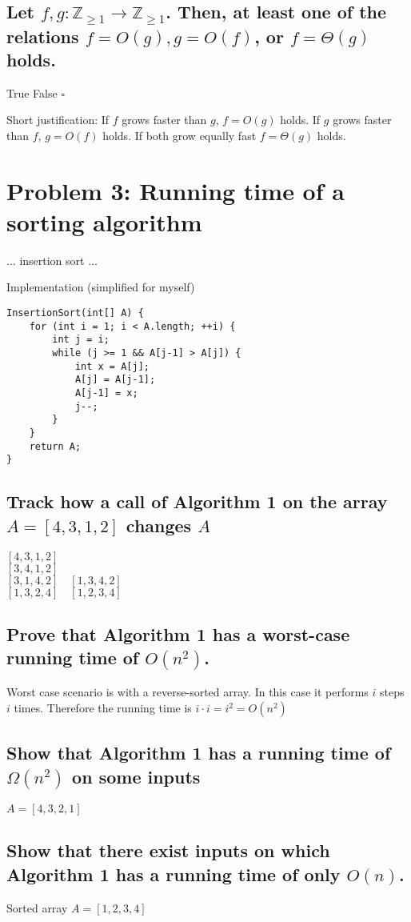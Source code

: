 \documentclass[12pt, a4]{article}
\newcommand{\cmark}{\ding{51}}%
\newcommand{\checkedbox}{\rlap{$\square$}{\raisebox{2pt}{\hspace{1pt}\cmark}}}
\begin{document}
\subsection{Let $f, g:\mathbb{Z}_{\geq1} \rightarrow \mathbb{Z}_{\geq1}$. Then, at least one of the relations $f=O(g),g=O(f)$, or $f= \Theta(g)$ holds.}
True \checkedbox\quad False $\square$

Short justification: If $f$ grows faster than $g$, $f=O(g)$ holds. If $g$ grows faster than $f$, $g=O(f)$ holds. If both grow equally fast $f=\Theta(g)$ holds.

\section{Problem 3: Running time of a sorting algorithm}
$\ldots$ insertion sort $\ldots$

Implementation (simplified for myself)
\begin{lstlisting}[language={[Sharp]c}]
InsertionSort(int[] A) {
	for (int i = 1; i < A.length; ++i) {
		int j = i;
		while (j >= 1 && A[j-1] > A[j]) {
			int x = A[j];
			A[j] = A[j-1];
			A[j-1] = x;
			j--;
		}
	}
	return A;
}
\end{lstlisting}

\subsection{Track how a call of Algorithm 1 on the array $A= [4,3,1,2]$ changes $A$}
$[4,3,1,2]$\\
$[3,4,1,2]$\\
$[3,1,4,2]\quad[1,3,4,2]$\\
$[1,3,2,4]\quad[1,2,3,4]$

\subsection{Prove that Algorithm 1 has a worst-case running time of $O(n^2)$.}
Worst case scenario is with a reverse-sorted array. In this case it performs $i$ steps $i$ times. Therefore the running time is $i\cdot i = i^2 = O(n^2)$

\subsection{Show that Algorithm 1 has a running time of $\Omega(n^2)$ on some inputs}
$A = [4,3,2,1]$

\subsection{Show that there exist inputs on which Algorithm 1 has a running time of only $O(n)$.}
Sorted array $A = [1,2,3,4]$
\end{document}
